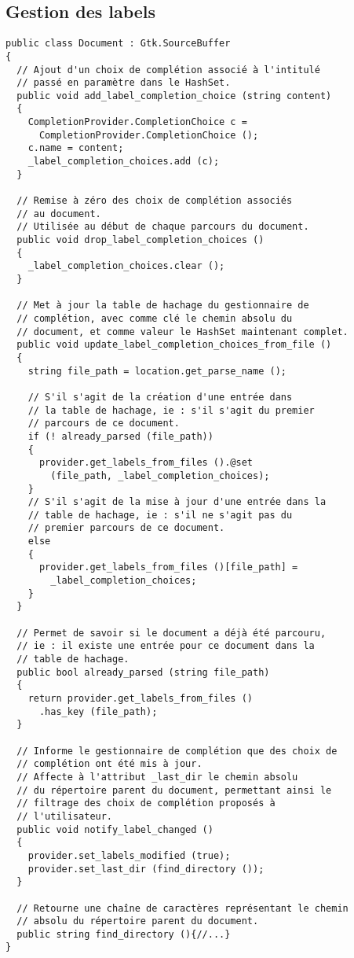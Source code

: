 \documentclass[a4paper,11pt]{report}
\begin{document}
\subsection{Gestion des labels}
\label{ssec:gestion_des_labels}

\begin{lstlisting}[frame=single]
public class Document : Gtk.SourceBuffer
{
  // Ajout d'un choix de complétion associé à l'intitulé
  // passé en paramètre dans le HashSet.
  public void add_label_completion_choice (string content)
  {
    CompletionProvider.CompletionChoice c = 
      CompletionProvider.CompletionChoice ();
    c.name = content;
    _label_completion_choices.add (c);
  }
  
  // Remise à zéro des choix de complétion associés
  // au document.
  // Utilisée au début de chaque parcours du document.
  public void drop_label_completion_choices ()
  {
    _label_completion_choices.clear ();
  }
  
  // Met à jour la table de hachage du gestionnaire de
  // complétion, avec comme clé le chemin absolu du
  // document, et comme valeur le HashSet maintenant complet.
  public void update_label_completion_choices_from_file ()
  {
    string file_path = location.get_parse_name ();
    
    // S'il s'agit de la création d'une entrée dans
    // la table de hachage, ie : s'il s'agit du premier
    // parcours de ce document.
    if (! already_parsed (file_path))
    {
      provider.get_labels_from_files ().@set
        (file_path, _label_completion_choices);
    }
    // S'il s'agit de la mise à jour d'une entrée dans la
    // table de hachage, ie : s'il ne s'agit pas du
    // premier parcours de ce document.
    else
    {
      provider.get_labels_from_files ()[file_path] =
        _label_completion_choices;
    }
  }
      
  // Permet de savoir si le document a déjà été parcouru,
  // ie : il existe une entrée pour ce document dans la
  // table de hachage.
  public bool already_parsed (string file_path)
  {
    return provider.get_labels_from_files ()
      .has_key (file_path);
  }
  
  // Informe le gestionnaire de complétion que des choix de
  // complétion ont été mis à jour.
  // Affecte à l'attribut _last_dir le chemin absolu
  // du répertoire parent du document, permettant ainsi le
  // filtrage des choix de complétion proposés à
  // l'utilisateur.
  public void notify_label_changed ()
  {
    provider.set_labels_modified (true);
    provider.set_last_dir (find_directory ());
  }
  
  // Retourne une chaîne de caractères représentant le chemin
  // absolu du répertoire parent du document.
  public string find_directory (){//...}
}
\end{lstlisting}
\end{document}

